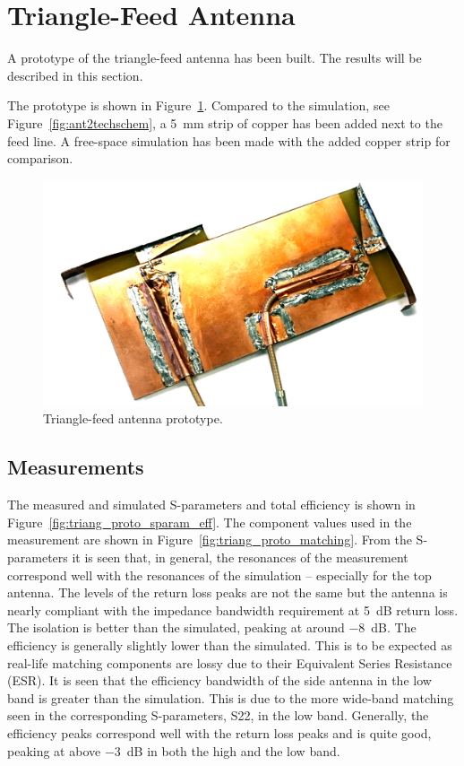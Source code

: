 \section{Triangle-Feed Antenna}
\label{sec:triang_proto}
A prototype of the triangle-feed antenna has been built. The results will be described in this section.

The prototype is shown in Figure~\ref{fig:triang_proto}. Compared to the simulation, see Figure~\ref{fig:ant2techschem}, a \SI{5}{mm} strip of copper has been added next to the feed line. A free-space simulation has been made with the added copper strip for comparison.

\begin{figure}[htbp]
    \centering
    \includegraphics{img/tech_sol/trianglefeed/mockup/mockup.jpg}
    \caption{Triangle-feed antenna prototype.}
    \label{fig:triang_proto}
\end{figure}

\subsection{Measurements}
The measured and simulated S-parameters and total efficiency is shown in Figure~\ref{fig:triang_proto_sparam_eff}. The component values used in the measurement are shown in Figure~\ref{fig:triang_proto_matching}. From the S-parameters it is seen that, in general, the resonances of the measurement correspond well with the resonances of the simulation -- especially for the top antenna. The levels of the return loss peaks are not the same but the antenna is nearly compliant with the impedance bandwidth requirement at \SI{5}{dB} return loss. The isolation is better than the simulated, peaking at around \SI{-8}{dB}. The efficiency is generally slightly lower than the simulated. This is to be expected as real-life matching components are lossy due to their Equivalent Series Resistance (ESR). It is seen that the efficiency bandwidth of the side antenna in the low band is greater than the simulation. This is due to the more wide-band matching seen in the corresponding S-parameters, S22, in the low band. Generally, the efficiency peaks correspond well with the return loss peaks and is quite good, peaking at above \SI{-3}{dB} in both the high and the low band.

